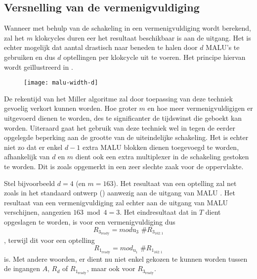 \subsection{Versnelling van de vermenigvuldiging}\label{subsectie-implementatie-gf2m-versnelling}

Wanneer met behulp van de schakeling in  een vermenigvuldiging wordt berekend, zal het $m$ klokcycles duren eer het resultaat beschikbaar is aan de uitgang. Het is echter mogelijk dat aantal drastisch naar beneden te halen door $d$ MALU's te gebruiken en dus $d$ optellingen per klokcycle uit te voeren. Het principe hiervan wordt ge\"illustreerd in .

\begin{figure}[h]
	\centering
		\texttt{[image: malu-width-d]}
		\label{figuur-implementatie-wrapper-gf2m-d}
\end{figure}

De rekentijd van het Miller algoritme zal door toepassing van deze techniek gevoelig verkort kunnen worden. Hoe groter $m$ en hoe meer vermenigvuldigigen er uitgevoerd dienen te worden, des te significanter de tijdswinst die geboekt kan worden. Uiteraard gaat het gebruik van deze techniek wel in tegen de eerder opgelegde beperking aan de grootte van de uiteindelijke schakeling. Het is echter niet zo dat er enkel $d - 1$ extra MALU blokken dienen toegevoegd te worden, afhankelijk van $d$ en $m$ dient ook een extra multiplexer in de schakeling gestoken te worden. Dit is zoals opgemerkt in  een zeer slechte zaak voor de  oppervlakte.

Stel bijvoorbeeld $d = 4$ (en $m = 	163$). Het resultaat van een optelling zal net zoals in het standaard ontwerp () aanwezig aan de uitgang van MALU . Het resultaat van een vermenigvuldiging zal echter aan de uitgang van MALU  verschijnen, aangezien $163 \bmod 4 = 3$. Het eindresultaat dat in $T$ dient opgeslagen te worden, is voor een vermenigvuldiging dus
\[R_{3_{\text{ready}}} = mod{\text{u}_3} \text{ \# } R_{3_{162:1}}\]
, terwijl dit voor een optelling
\[R_{1_{\text{ready}}} = mod_{\text{u}_1} \text{ \# } R_{1_{162:1}}\]
is. Met andere woorden, er dient nu niet enkel gekozen te kunnen worden tussen de ingangen $A$, $R_d$ of $R_{1_{\text{ready}}}$, maar ook voor $R_{3_{\text{ready}}}$.

